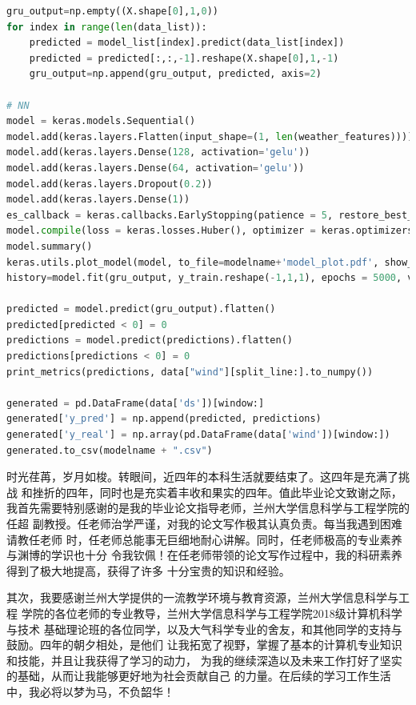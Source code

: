\documentclass[AutoFakeBold]{LZUThesis}
\begin{document}
\begin{lstlisting}[language = python]
gru_output=np.empty((X.shape[0],1,0))
for index in range(len(data_list)):
    predicted = model_list[index].predict(data_list[index])
    predicted = predicted[:,:,-1].reshape(X.shape[0],1,-1)
    gru_output=np.append(gru_output, predicted, axis=2)

# NN
model = keras.models.Sequential()
model.add(keras.layers.Flatten(input_shape=(1, len(weather_features))))
model.add(keras.layers.Dense(128, activation='gelu'))
model.add(keras.layers.Dense(64, activation='gelu'))
model.add(keras.layers.Dropout(0.2))
model.add(keras.layers.Dense(1))
es_callback = keras.callbacks.EarlyStopping(patience = 5, restore_best_weights = True, monitor="loss")
model.compile(loss = keras.losses.Huber(), optimizer = keras.optimizers.Nadam(0.001))
model.summary()
keras.utils.plot_model(model, to_file=modelname+'model_plot.pdf', show_shapes=True, show_layer_names=True)
history=model.fit(gru_output, y_train.reshape(-1,1,1), epochs = 5000, verbose = 1, shuffle = True, callbacks = [es_callback])

predicted = model.predict(gru_output).flatten()
predicted[predicted < 0] = 0
predictions = model.predict(predictions).flatten()
predictions[predictions < 0] = 0
print_metrics(predictions, data["wind"][split_line:].to_numpy())

generated = pd.DataFrame(data['ds'])[window:]
generated['y_pred'] = np.append(predicted, predictions)
generated['y_real'] = np.array(pd.DataFrame(data['wind'])[window:])
generated.to_csv(modelname + ".csv")
\end{lstlisting}

\Thanks

时光荏苒，岁月如梭。转眼间，近四年的本科生活就要结束了。这四年是充满了挑战
和挫折的四年，同时也是充实着丰收和果实的四年。值此毕业论文致谢之际，
我首先需要特别感谢的是我的毕业论文指导老师，兰州大学信息科学与工程学院的任超
副教授。任老师治学严谨，对我的论文写作极其认真负责。每当我遇到困难请教任老师
时，任老师总能事无巨细地耐心讲解。同时，任老师极高的专业素养与渊博的学识也十分
令我钦佩！在任老师带领的论文写作过程中，我的科研素养得到了极大地提高，获得了许多
十分宝贵的知识和经验。

其次，我要感谢兰州大学提供的一流教学环境与教育资源，兰州大学信息科学与工程
学院的各位老师的专业教导，兰州大学信息科学与工程学院2018级计算机科学与技术
基础理论班的各位同学，以及大气科学专业的舍友，和其他同学的支持与鼓励。四年的朝夕相处，是他们
让我拓宽了视野，掌握了基本的计算机专业知识和技能，并且让我获得了学习的动力，
为我的继续深造以及未来工作打好了坚实的基础，从而让我能够更好地为社会贡献自己
的力量。在后续的学习工作生活中，我必将以梦为马，不负韶华！
\end{document}
